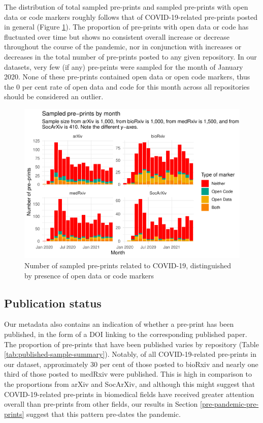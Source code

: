 \documentclass[
]{article}
\begin{document}
The distribution of total sampled pre-prints and sampled pre-prints with open data or code markers roughly follows that of COVID-19-related pre-prints posted in general (Figure \ref{fig:monthly-papers-condition-stack}). The proportion of pre-prints with open data or code has fluctuated over time but shows no consistent overall increase or decrease throughout the course of the pandemic, nor in conjunction with increases or decreases in the total number of pre-prints posted to any given repository. In our datasets, very few (if any) pre-prints were sampled for the month of January 2020. None of these pre-prints contained open data or open code markers, thus the 0 per cent rate of open data and code for this month across all repositories should be considered an outlier.

\begin{figure}

{\centering \includegraphics[width=0.9\linewidth]{paper_files/figure-latex/monthly-papers-condition-stack-1} 

}

\caption{Number of sampled pre-prints related to COVID-19, distinguished by presence of open data or code markers}\label{fig:monthly-papers-condition-stack}
\end{figure}

\hypertarget{publication-status}{%
\subsection{Publication status}\label{publication-status}}

Our metadata also contains an indication of whether a pre-print has been published, in the form of a DOI linking to the corresponding published paper. The proportion of pre-prints that have been published varies by repository (Table \ref{tab:published-sample-summary}). Notably, of all COVID-19-related pre-prints in our dataset, approximately 30 per cent of those posted to bioRxiv and nearly one third of those posted to medRxiv were published. This is high in comparison to the proportions from arXiv and SocArXiv, and although this might suggest that COVID-19-related pre-prints in biomedical fields have received greater attention overall than pre-prints from other fields, our results in Section \ref{pre-pandemic-pre-prints} suggest that this pattern pre-dates the pandemic.
\end{document}

